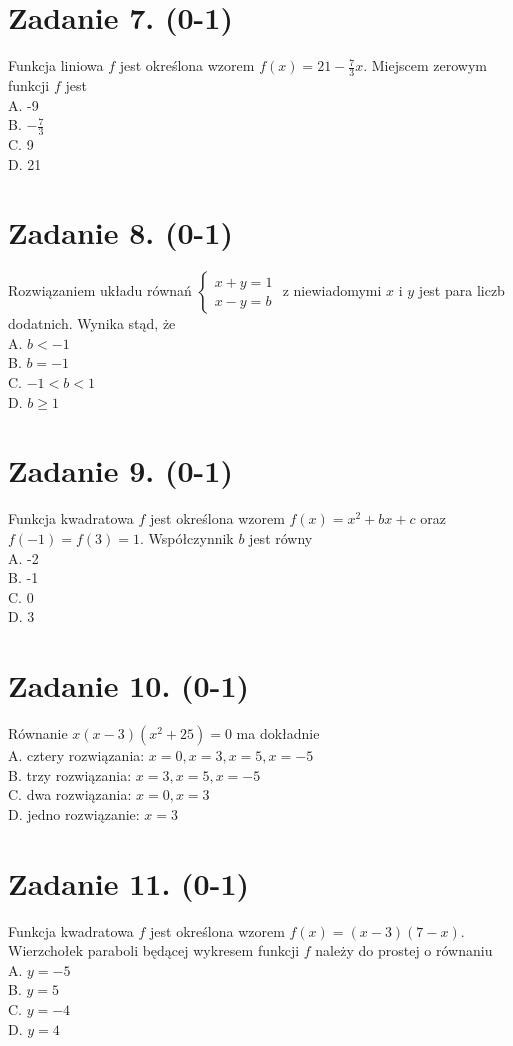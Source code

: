 \documentclass[10pt]{article}
\begin{document}
\section*{Zadanie 7. (0-1)}
Funkcja liniowa \(f\) jest określona wzorem \(f(x)=21-\frac{7}{3} x\). Miejscem zerowym funkcji \(f\) jest\\
A. -9\\
B. \(-\frac{7}{3}\)\\
C. 9\\
D. 21

\section*{Zadanie 8. (0-1)}
Rozwiązaniem układu równań \(\left\{\begin{array}{l}x+y=1 \\ x-y=b\end{array}\right.\) z niewiadomymi \(x\) i \(y\) jest para liczb dodatnich. Wynika stąd, że\\
A. \(b<-1\)\\
B. \(b=-1\)\\
C. \(-1<b<1\)\\
D. \(b \geq 1\)

\section*{Zadanie 9. (0-1)}
Funkcja kwadratowa \(f\) jest określona wzorem \(f(x)=x^{2}+b x+c\) oraz \(f(-1)=f(3)=1\). Współczynnik \(b\) jest równy\\
A. -2\\
B. -1\\
C. 0\\
D. 3

\section*{Zadanie 10. (0-1)}
Równanie \(x(x-3)\left(x^{2}+25\right)=0\) ma dokładnie\\
A. cztery rozwiązania: \(x=0, x=3, x=5, x=-5\)\\
B. trzy rozwiązania: \(x=3, x=5, x=-5\)\\
C. dwa rozwiązania: \(x=0, x=3\)\\
D. jedno rozwiązanie: \(x=3\)

\section*{Zadanie 11. (0-1)}
Funkcja kwadratowa \(f\) jest określona wzorem \(f(x)=(x-3)(7-x)\). Wierzchołek paraboli będącej wykresem funkcji \(f\) należy do prostej o równaniu\\
A. \(y=-5\)\\
B. \(y=5\)\\
C. \(y=-4\)\\
D. \(y=4\)
\end{document}
